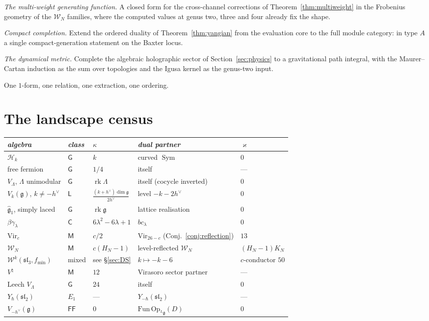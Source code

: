 \documentclass[11pt]{amsart}
\numberwithin{equation}{section}
\theoremstyle{plain}
\theoremstyle{definition}
\theoremstyle{remark}
\newcommand{\cW}{\mathcal{W}}
\newcommand{\fg}{\mathfrak{g}}
\newcommand{\Vir}{\mathrm{Vir}}
\newcommand{\dvee}{h^{\vee}}
\begin{document}
\emph{The multi-weight generating function.} A closed form for the
cross-channel corrections of Theorem~\ref{thm:multiweight} in the
Frobenius geometry of the $\cW_N$ families, where the computed
values at genus two, three and four already fix the shape.

\emph{Compact completion.} Extend the ordered duality of
Theorem~\ref{thm:yangian} from the evaluation core to the full
module category: in type $A$ a single compact-generation statement
on the Baxter locus.

\emph{The dynamical metric.} Complete the algebraic holographic
sector of Section~\ref{sec:physics} to a gravitational path
integral, with the Maurer--Cartan induction as the sum over
topologies and the Igusa kernel as the genus-two input.

One $1$-form, one relation, one extraction, one ordering.

\appendix

\section{The landscape census}\label{app:census}

\begin{center}\small
\begin{tabular}{lllll}
\emph{algebra} & \emph{class} & $\kappa$ & \emph{dual partner} &
$\varkappa$\\
\hline
$\mathcal{H}_k$ & $\mathsf{G}$ & $k$ &
curved $\operatorname{Sym}$ & $0$\\
free fermion & $\mathsf{G}$ & $1/4$ & itself & --- \\
$V_\Lambda$, $\Lambda$ unimodular & $\mathsf{G}$ &
$\operatorname{rk}\Lambda$ & itself (cocycle inverted) & $0$\\
$V_k(\fg)$, $k\neq-\dvee$ & $\mathsf{L}$ &
$\frac{(k+\dvee)\dim\fg}{2\dvee}$ &
level $-k-2\dvee$ & $0$\\
$\widehat{\fg}_1$, simply laced & $\mathsf{G}$ &
$\operatorname{rk}\fg$ & lattice realisation & $0$\\
$\beta\gamma_\lambda$ & $\mathsf{C}$ & $6\lambda^{2}-6\lambda+1$ &
$bc_\lambda$ & $0$\\
$\Vir_c$ & $\mathsf{M}$ & $c/2$ &
$\Vir_{26-c}$ (Conj.~\ref{conj:reflection}) & $13$\\
$\cW_N$ & $\mathsf{M}$ & $c(H_N-1)$ &
level-reflected $\cW_N$ & $(H_N{-}1)K_N$\\
$\cW^{k}(\mathfrak{sl}_3,f_{\min})$ & mixed & see \S\ref{sec:DS} &
$k\mapsto-k-6$ & $c$-conductor $50$\\
$V^{\natural}$ & $\mathsf{M}$ & $12$ & Virasoro sector partner & ---\\
Leech $V_\Lambda$ & $\mathsf{G}$ & $24$ & itself & $0$\\
$Y_\hbar(\mathfrak{sl}_2)$ & $E_1$ & --- &
$Y_{-\hbar}(\mathfrak{sl}_2)$ & ---\\
$V_{-\dvee}(\fg)$ & $\mathsf{FF}$ & $0$ &
$\mathrm{Fun}\,\mathrm{Op}_{{}^{L}\fg}(D)$ & $0$
\end{tabular}
\end{center}
\end{document}
